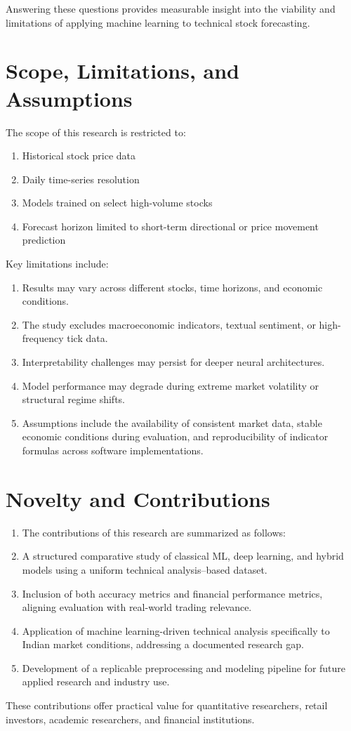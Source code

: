Answering these questions provides measurable insight into the viability and limitations of applying machine learning to technical stock forecasting.

\section{Scope, Limitations, and Assumptions}

The scope of this research is restricted to:

\begin{enumerate}
  \item Historical stock price data
  \item Daily time-series resolution
  \item Models trained on select high-volume stocks
  \item Forecast horizon limited to short-term directional or price movement prediction
\end{enumerate}

Key limitations include:

\begin{enumerate}
  \item Results may vary across different stocks, time horizons, and economic conditions.
  \item The study excludes macroeconomic indicators, textual sentiment, or high-frequency tick data.
  \item Interpretability challenges may persist for deeper neural architectures.
  \item Model performance may degrade during extreme market volatility or structural regime shifts.
  \item Assumptions include the availability of consistent market data, stable economic conditions during evaluation, and reproducibility of indicator formulas across software implementations.
\end{enumerate}

\section{Novelty and Contributions}

\begin{enumerate}
  \item The contributions of this research are summarized as follows:
  \item A structured comparative study of classical ML, deep learning, and hybrid models using a uniform technical analysis–based dataset.
  \item Inclusion of both accuracy metrics and financial performance metrics, aligning evaluation with real-world trading relevance.
  \item Application of machine learning-driven technical analysis specifically to Indian market conditions, addressing a documented research gap. 
  \item Development of a replicable preprocessing and modeling pipeline for future applied research and industry use.
\end{enumerate}

These contributions offer practical value for quantitative researchers, retail investors, academic researchers, and financial institutions.

